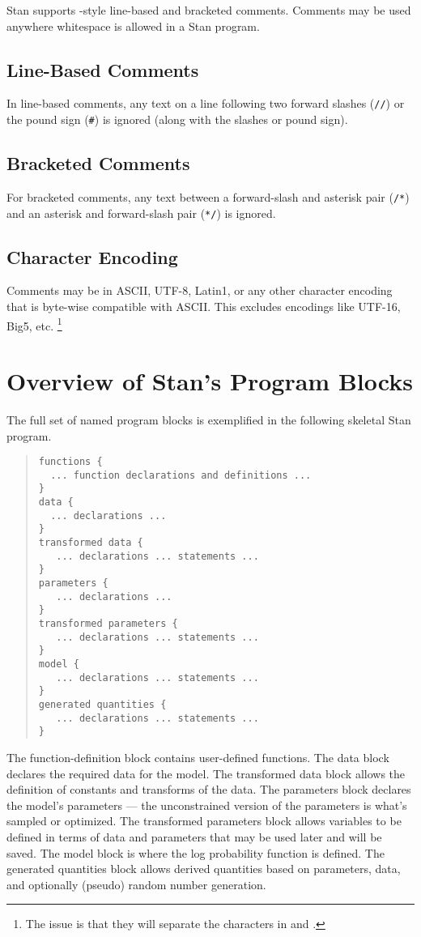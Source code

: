 Stan supports \Cpp-style line-based and bracketed comments.  Comments
may be used anywhere whitespace is allowed in a Stan program.

\subsection{Line-Based Comments}

In line-based comments, any text on a line following
two forward slashes (\Verb|//|) or the pound sign (\Verb|#|)
is ignored (along with the slashes or pound sign).  

\subsection{Bracketed Comments}

For bracketed comments, any text between a forward-slash and asterisk
pair (\Verb|/*|) and an asterisk and forward-slash pair (\Verb|*/|) is
ignored.

\subsection{Character Encoding}

Comments may be in ASCII, UTF-8, Latin1, or any other character
encoding that is byte-wise compatible with ASCII.  This excludes
encodings like UTF-16, Big5, etc.%
%
\footnote{The issue is that they will separate the characters in
  \code{*/} and \code{*/}.}


\section{Overview of Stan's Program Blocks}

The full set of named program blocks is exemplified in the following
skeletal Stan program.
%
\begin{quote}
\begin{Verbatim} 
functions {
  ... function declarations and definitions ...
}
data { 
  ... declarations ...
}
transformed data { 
   ... declarations ... statements ... 
}
parameters { 
   ... declarations ... 
}
transformed parameters { 
   ... declarations ... statements ...
}
model { 
   ... declarations ... statements ...
}
generated quantities {
   ... declarations ... statements ...
}
\end{Verbatim}
\end{quote}
%
The function-definition block contains user-defined functions.  The
data block declares the required data for the model.  The transformed
data block allows the definition of constants and transforms of the
data.  The parameters block declares the model's parameters --- the
unconstrained version of the parameters is what's sampled or
optimized.  The transformed parameters block allows variables to be
defined in terms of data and parameters that may be used later and
will be saved.  The model block is where the log probability function
is defined.  The generated quantities block allows derived quantities
based on parameters, data, and optionally (pseudo) random number
generation.


